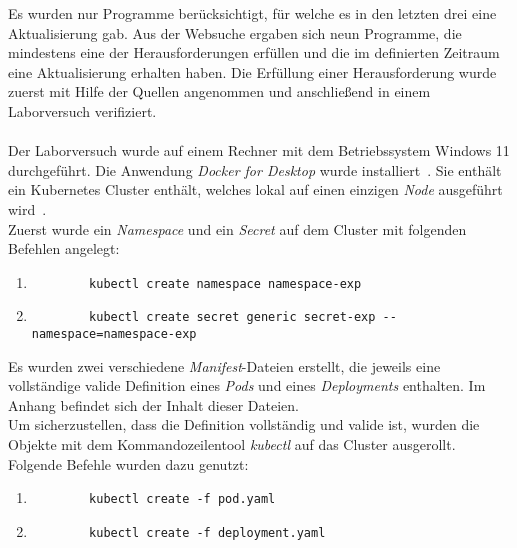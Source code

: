 Es wurden nur Programme berücksichtigt, für welche es in den letzten drei eine Aktualisierung gab.
Aus der Websuche ergaben sich neun Programme, die mindestens eine der Herausforderungen erfüllen und die
im definierten Zeitraum eine Aktualisierung erhalten haben.
Die Erfüllung einer Herausforderung wurde zuerst mit Hilfe der Quellen angenommen und anschließend
in einem Laborversuch verifiziert.
\\\\
Der Laborversuch wurde auf einem Rechner mit dem Betriebssystem Windows 11 durchgeführt.
Die Anwendung \textit{Docker for Desktop} wurde installiert~\cite{docker-for-desktop-overview}. Sie enthält ein Kubernetes Cluster enthält,
welches lokal auf einen einzigen \textit{Node} ausgeführt wird~\cite{docker-for-desktop-kubernetes}.
\\
Zuerst wurde ein \textit{Namespace} und ein \textit{Secret} auf dem Cluster mit folgenden Befehlen angelegt:
\begin{enumerate}
    \item
          \begin{verbatim}
        kubectl create namespace namespace-exp
    \end{verbatim}
    \item
          \begin{verbatim}
        kubectl create secret generic secret-exp --namespace=namespace-exp
    \end{verbatim}
\end{enumerate}
Es wurden zwei verschiedene \textit{Manifest}-Dateien erstellt,
die jeweils eine vollständige valide Definition eines \textit{Pods} und eines \textit{Deployments} enthalten.
Im Anhang befindet sich der Inhalt dieser Dateien.
\\
Um sicherzustellen, dass die Definition vollständig und valide ist, wurden die Objekte mit dem Kommandozeilentool \textit{kubectl} auf das Cluster ausgerollt.
Folgende Befehle wurden dazu genutzt:
\begin{enumerate}
    \item
          \begin{verbatim}
        kubectl create -f pod.yaml
    \end{verbatim}
    \item
          \begin{verbatim}
        kubectl create -f deployment.yaml
    \end{verbatim}
\end{enumerate}



